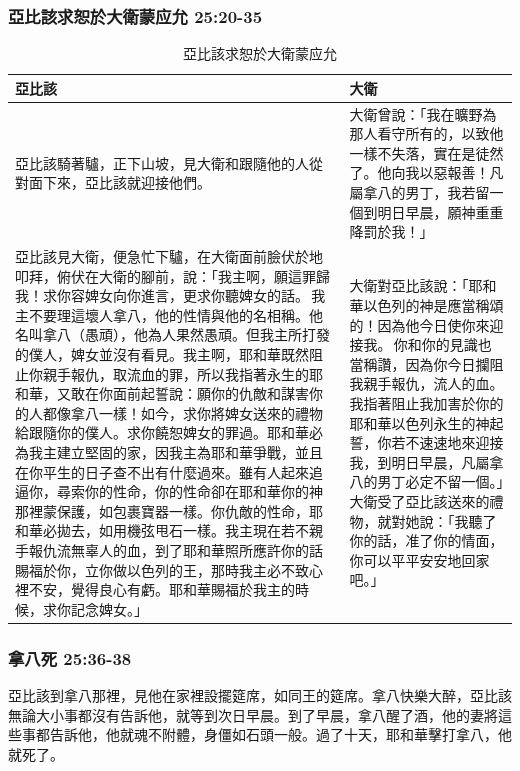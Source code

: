 \subsubsection{亞比該求恕於大衛蒙应允 25:20-35}
\begin{table}[H]
\hspace*{-5mm}
\centering
\begin{tabular}{p{10.5cm}|p{6.5cm}}\hline\hline
亞比該&大衛\\\hline
亞比該騎著驢，正下山坡，見大衛和跟隨他的人從對面下來，亞比該就迎接他們。 
&大衛曾說：「我在曠野為那人看守所有的，以致他一樣不失落，實在是徒然了。他向我以惡報善！凡屬拿八的男丁，我若留一個到明日早晨，願神重重降罰於我！」\\\hline
亞比該見大衛，便急忙下驢，在大衛面前臉伏於地叩拜，俯伏在大衛的腳前，說：「我主啊，願這罪歸我！求你容婢女向你進言，更求你聽婢女的話。 我主不要理這壞人拿八，他的性情與他的名相稱。他名叫拿八（愚頑），他為人果然愚頑。但我主所打發的僕人，婢女並沒有看見。我主啊，耶和華既然阻止你親手報仇，取流血的罪，所以我指著永生的耶和華，又敢在你面前起誓說：願你的仇敵和謀害你的人都像拿八一樣！如今，求你將婢女送來的禮物給跟隨你的僕人。求你饒恕婢女的罪過。耶和華必為我主建立堅固的家，因我主為耶和華爭戰，並且在你平生的日子查不出有什麼過來。雖有人起來追逼你，尋索你的性命，你的性命卻在耶和華你的神那裡蒙保護，如包裹寶器一樣。你仇敵的性命，耶和華必拋去，如用機弦甩石一樣。我主現在若不親手報仇流無辜人的血，到了耶和華照所應許你的話賜福於你，立你做以色列的王，那時我主必不致心裡不安，覺得良心有虧。耶和華賜福於我主的時候，求你記念婢女。」&大衛對亞比該說：「耶和華以色列的神是應當稱頌的！因為他今日使你來迎接我。 你和你的見識也當稱讚，因為你今日攔阻我親手報仇，流人的血。我指著阻止我加害於你的耶和華以色列永生的神起誓，你若不速速地來迎接我，到明日早晨，凡屬拿八的男丁必定不留一個。」大衛受了亞比該送來的禮物，就對她說：「我聽了你的話，准了你的情面，你可以平平安安地回家吧。」\\\hline
\end{tabular}
\caption{亞比該求恕於大衛蒙应允}
\end{table}

\subsubsection{拿八死 25:36-38}
亞比該到拿八那裡，見他在家裡設擺筵席，如同王的筵席。拿八快樂大醉，亞比該無論大小事都沒有告訴他，就等到次日早晨。到了早晨，拿八醒了酒，他的妻將這些事都告訴他，他就魂不附體，身僵如石頭一般。過了十天，耶和華擊打拿八，他就死了。

